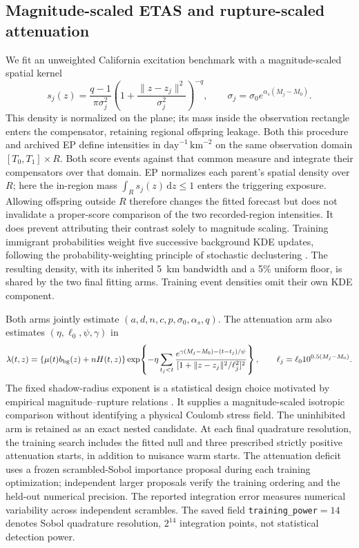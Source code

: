 \subsection{Magnitude-scaled ETAS and rupture-scaled attenuation}
\label{sec:epplus_benchmark}
We fit an unweighted California excitation benchmark with a
magnitude-scaled spatial kernel
\[
 s_j(z)=\frac{q-1}{\pi\sigma_j^2}
       \left(1+\frac{\|z-z_j\|^2}{\sigma_j^2}\right)^{-q},
 \qquad \sigma_j=\sigma_0 e^{\alpha_s(M_j-M_0)}.
\]
This density is normalized on the plane; its mass inside the observation
rectangle enters the compensator, retaining regional offspring leakage.
Both this procedure and archived EP define intensities in
$\mathrm{day}^{-1}\,\mathrm{km}^{-2}$ on the same observation domain
$[T_0,T_1]\times R$. Both score events against that common measure and
integrate their compensators over that domain. EP normalizes each parent's
spatial density over $R$; here the in-region mass $\int_R s_j(z)\,\mathrm{d}z\leq1$
enters the triggering exposure. Allowing offspring outside $R$ therefore
changes the fitted forecast but does not invalidate a proper-score comparison
of the two recorded-region intensities. It does prevent attributing their
contrast solely to magnitude scaling.
Training immigrant probabilities weight five successive background KDE updates,
following the probability-weighting principle of stochastic declustering
\citep{ZhuangOgataVereJones2002}. The resulting density, with its inherited 5~km
bandwidth and a 5\% uniform floor, is shared by the two final fitting arms.
Training event densities omit their own KDE component.

Both arms jointly estimate $(a,d,n,c,p,\sigma_0,\alpha_s,q)$.
The attenuation arm also estimates $(\eta,\ell_0,\psi,\gamma)$ in
\[
 \lambda(t,z)=\{\mu(t)b_{\rm bg}(z)+nH(t,z)\}
 \exp\!\left\{-\eta\sum_{t_j<t}
 \frac{e^{\gamma(M_j-M_0)-(t-t_j)/\psi}}
 {[1+\|z-z_j\|^2/\ell_j^2]^2}\right\},
 \qquad \ell_j=\ell_0 10^{0.5(M_j-M_0)}.
\]
The fixed shadow-radius exponent is a statistical design choice motivated by
empirical magnitude--rupture relations \citep{wells1994rupture}. It supplies a
magnitude-scaled isotropic comparison without identifying a physical Coulomb
stress field. The uninhibited arm is retained as an exact nested candidate. At each final
quadrature resolution, the training search includes the fitted null and three
prescribed strictly positive attenuation starts, in addition to nuisance warm
starts.
The attenuation deficit uses a frozen scrambled-Sobol importance proposal during
each training optimization; independent larger proposals verify the training
ordering and the held-out numerical precision. The reported integration error
measures numerical variability across independent scrambles.
The saved field \texttt{training\_power}$=14$ denotes Sobol quadrature
resolution, $2^{14}$ integration points, not statistical detection power.

